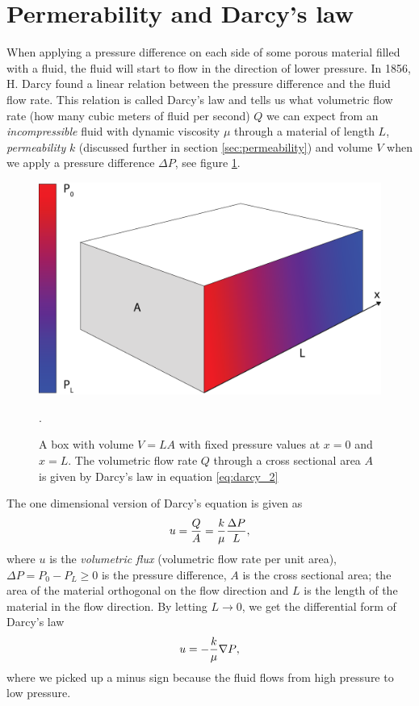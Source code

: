 \section{Permerability and Darcy's law}
\label{sec:darcy_law}
When applying a pressure difference on each side of some porous material filled with a fluid, the fluid will start to flow in the direction of lower pressure. In 1856, H. Darcy found a linear relation between the pressure difference and the fluid flow rate. This relation is called Darcy's law and tells us what volumetric flow rate (how many cubic meters of fluid per second) $Q$ we can expect from an \textit{incompressible} fluid with dynamic viscosity $\mu$ through a material of length $L$, \textit{permeability} $k$ (discussed further in section \ref{sec:permeability}) and volume $V$ when we apply a pressure difference $\Delta P$, see figure \ref{fig:darcys_law}. 
\begin{figure}[h]
\begin{center}
\includegraphics[width=\textwidth, trim=0cm 0cm 0cm 0cm, clip]{kinetic_theory/figures/darcy.eps}
\label{fig:darcys_law}
\end{center}
\caption{A box with volume $V=LA$ with fixed pressure values at $x=0$ and $x=L$. The volumetric flow rate $Q$ through a cross sectional area $A$ is given by Darcy's law in equation \eqref{eq:darcy_2}}.
\end{figure}
The one dimensional version of Darcy's equation is given as 
\begin{align}
\label{eq:darcy_1}
	u = {Q\over A} = {k\over \mu}{\Delta P\over L},
\end{align}
where $u$ is the \textit{volumetric flux} (volumetric flow rate per unit area), $\Delta P = P_0 - P_L \geq 0$ is the pressure difference, $A$ is the cross sectional area; the area of the material orthogonal on the flow direction and $L$ is the length of the material in the flow direction. By letting $L\rightarrow 0$, we get the differential form of Darcy's law
\begin{align}
\label{eq:darcy_2}
	u = -{k\over \mu}{\nabla P},
\end{align}
where we picked up a minus sign because the fluid flows from high pressure to low pressure. 


